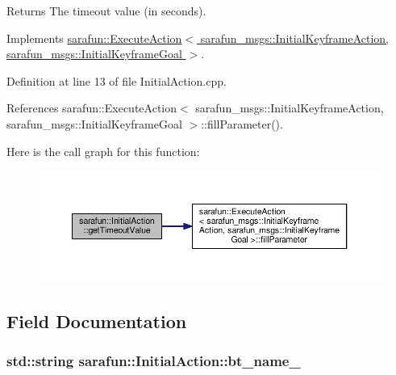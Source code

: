 \begin{DoxyReturn}{Returns}
The timeout value (in seconds). 
\end{DoxyReturn}


Implements \hyperlink{classsarafun_1_1ExecuteAction_aba6cfa8a8ce19e735eb6394424df6d17_aba6cfa8a8ce19e735eb6394424df6d17}{sarafun\-::\-Execute\-Action$<$ sarafun\-\_\-msgs\-::\-Initial\-Keyframe\-Action, sarafun\-\_\-msgs\-::\-Initial\-Keyframe\-Goal $>$}.



Definition at line 13 of file Initial\-Action.\-cpp.



References sarafun\-::\-Execute\-Action$<$ sarafun\-\_\-msgs\-::\-Initial\-Keyframe\-Action, sarafun\-\_\-msgs\-::\-Initial\-Keyframe\-Goal $>$\-::fill\-Parameter().



Here is the call graph for this function\-:
\nopagebreak
\begin{figure}[H]
\begin{center}
\leavevmode
\includegraphics[width=350pt]{d6/d64/classsarafun_1_1InitialAction_a1b58c06c32ec9f9d3e75c37de5e7d2c8_a1b58c06c32ec9f9d3e75c37de5e7d2c8_cgraph}
\end{center}
\end{figure}




\subsection{Field Documentation}
\hypertarget{classsarafun_1_1InitialAction_aaa1d120b5ff08ffaebe777d8f3793be3_aaa1d120b5ff08ffaebe777d8f3793be3}{
\subsubsection[{bt\-\_\-name\-\_\-}]{\setlength{\rightskip}{0pt plus 5cm}std\-::string sarafun\-::\-Initial\-Action\-::bt\-\_\-name\-\_\-\hspace{0.3cm}{\ttfamily [private]}}}\label{classsarafun_1_1InitialAction_aaa1d120b5ff08ffaebe777d8f3793be3_aaa1d120b5ff08ffaebe777d8f3793be3}


